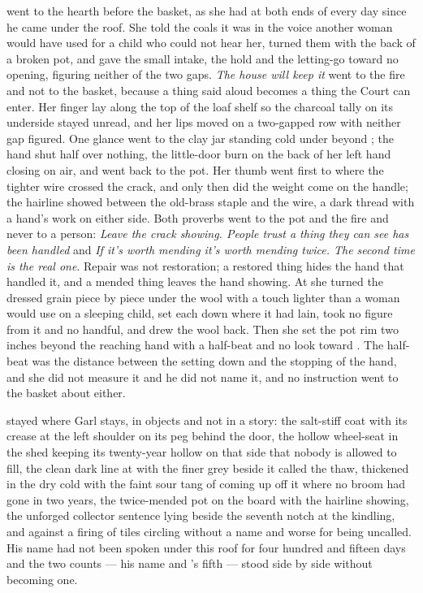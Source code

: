  went to the hearth before the basket, as she had at both ends of every day since he came under the roof. She told the coals it was  in the voice another woman would have used for a child who could not hear her, turned them with the back of a broken pot, and gave the small intake, the hold and the letting-go toward no opening, figuring neither of the two gaps. \emph{The house will keep it} went to the fire and not to the basket, because a thing said aloud becomes a thing the Court can enter. Her finger lay along the top of the loaf shelf so the charcoal tally on its underside stayed unread, and her lips moved on a two-gapped row with neither gap figured. One glance went to the clay jar standing cold under  beyond ; the hand shut half over nothing, the little-door burn on the back of her left hand closing on air, and went back to the pot. Her thumb went first to where the tighter wire crossed the crack, and only then did the weight come on the handle; the hairline showed between the old-brass staple and the wire, a dark thread with a hand's work on either side. Both proverbs went to the pot and the fire and never to a person: \emph{Leave the crack showing. People trust a thing they can see has been handled} and \emph{If it's worth mending it's worth mending twice. The second time is the real one}. Repair was not restoration; a restored thing hides the hand that handled it, and a mended thing leaves the hand showing. At  she turned the dressed grain piece by piece under the wool with a touch lighter than a woman would use on a sleeping child, set each down where it had lain, took no figure from it and no handful, and drew the wool back. Then she set the pot rim two inches beyond the reaching hand with a half-beat and no look toward . The half-beat was the distance between the setting down and the stopping of the hand, and she did not measure it and he did not name it, and no instruction went to the basket about either.

 stayed where Garl stays, in objects and not in a story: the salt-stiff coat with its crease at the left shoulder on its peg behind the door, the hollow wheel-seat in the shed keeping its twenty-year hollow on that side that nobody is allowed to fill, the clean dark line at  with the finer grey beside it called the thaw, thickened in the dry cold with the faint sour tang of  coming up off it where no broom had gone in two years, the twice-mended pot on the board with the hairline showing, the unforged collector sentence lying beside the seventh notch at the kindling, and  against a firing of tiles circling without a name and worse for being uncalled. His name had not been spoken under this roof for four hundred and fifteen days and the two counts --- his name and 's fifth --- stood side by side without becoming one.

